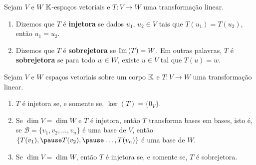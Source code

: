 \documentclass{beamer}
\begin{document}
    \begin{frame}
        \begin{definicao}
            Sejam $V$ e $W$ $\mathbb{K}$-espaços vetoriais \pause e $T \colon V \to W$ uma transformação linear.\pause
            \begin{enumerate}[label={\roman*})]
                \vspace*{.25cm}
                \item Dizemos que $T$ é \textbf{injetora} \pause se dados $u_1$, $u_2 \in V$ \pause tais que $T(u_1) = T(u_2)$, \pause então
                    $u_1 = u_2$. \pause

                \vspace{1cm}

                \item Dizemos que $T$ é \textbf{sobrejetora} \pause se ${\rm Im\,}(T) = W$. \pause Em outras palavras, \pause $T$ é
                    \textbf{sobrejetora} se para todo $w \in W$, \pause existe $u \in V$ tal que $T(u) = w$.
            \end{enumerate}
        \end{definicao}
    \end{frame}

    \begin{frame}
        \begin{proposicao}
            Sejam $V$ e $W$ espaços vetoriais sobre um corpo $\mathbb{K}$ \pause e $T \colon V \to W$ uma transformação linear.\pause
            \begin{enumerate}[label={\roman*})]
                \vspace*{.25cm}
                \item $T$ é injetora \pause se, e somente se, $\ker(T) = \{0_V\}$.\pause

                \vspace{.75cm}

                \item Se $\dim V = \dim W$  e $T$ é injetora, \pause então $T$ transforma bases em bases, \pause isto é, se
                    $\mathcal{B} = \{v_1, v_2, \dots, v_n\}$ é uma base de $V$, \pause então $\{T(v_1), \pause T(v_2), \pause \dots,
                    T(v_n)\}$ é uma base de $W$.\pause

                \vspace{.75cm}

                \item Se $\dim V = \dim W$, \pause então $T$ é injetora \pause se, e somente se, \pause $T$ é sobrejetora.
            \end{enumerate}
        \end{proposicao}
    \end{frame}
\end{document}
